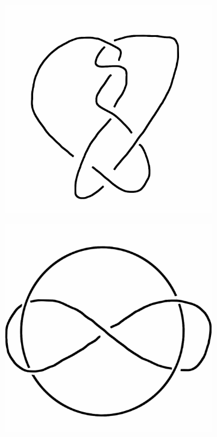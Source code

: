 \documentclass[12pt,letterpaper]{article}
\theoremstyle{definition}
\begin{document}
\begin{figure}[h]
    \centering
    \begin{subfigure}{.3\textwidth}
        \centering
        \includegraphics[width=\textwidth]{rgp11pics/ex1.png}
    \end{subfigure}
    \quad
    \begin{subfigure}{.3\textwidth}
        \centering
        \includegraphics[width=\textwidth]{rgp11pics/ex2.png}

\end{subfigure}
\end{figure}
\end{document}
